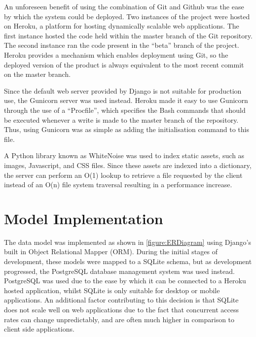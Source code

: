 \documentclass[a4paper]{l3proj}
\begin{document}
An unforeseen benefit of using the combination of Git and Github was the ease by which the system could be deployed. Two instances of the project were hosted on Heroku, a platform for hosting dynamically scalable web applications. The first instance hosted the code held within the master branch of the Git repository. The second instance ran the code present in the “beta” branch of the project. Heroku provides a mechanism which enables deployment using Git, so the deployed version of the product is always equivalent to the most recent commit on the master branch.

Since the default web server provided by Django is not suitable for production use, the Gunicorn \cite{site:gunicorn} server was used instead. Heroku \cite{site:heroku} made it easy to use Gunicorn through the use of a “Procfile”, which specifies the Bash commands that should be executed whenever a write is made to the master branch of the repository. Thus, using Gunicorn was as simple as adding the initialisation command to this file.

A Python library known as WhiteNoise \cite{site:whitenoise} was used to index static assets, such as images, Javascript, and CSS files. Since these assets are indexed into a dictionary, the server can perform an O(1) lookup to retrieve a file requested by the client instead of an O(n) file system traversal resulting in a performance increase.

\section{Model Implementation}
\label{modelImpl}


The data model was implemented as shown in \autoref{figure:ERDiagram} using Django’s built in Object Relational Mapper (ORM). During the initial stages of development, these models were mapped to a SQLite \cite{site:sqlite} schema, but as development progressed, the PostgreSQL database management system was used instead. PostgreSQL \cite{site:postgresql} was used due to the ease by which it can be connected to a Heroku hosted application, whilst SQLite is only suitable for desktop or mobile applications. An additional factor contributing to this decision is that SQLite does not scale well on web applications due to the fact that concurrent access rates can change unpredictably, and are often much higher in comparison to client side applications.
\end{document}
